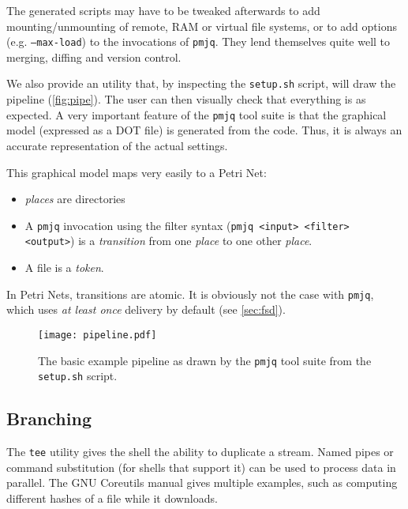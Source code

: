 \documentclass[letterpaper,twocolumn,10pt]{article}
\begin{document}
The generated scripts may have to be tweaked afterwards to add mounting/unmounting of remote, RAM or virtual file systems, or to add options (e.g. {\tt --max-load}) to the invocations of {\tt pmjq}. They lend themselves quite well to merging, diffing and version control.

We also provide an utility that, by inspecting the {\tt setup.sh} script, will draw the pipeline (\autoref{fig:pipe}). The user can then visually check that everything is as expected. A very important feature of the {\tt pmjq} tool suite is that the graphical model (expressed as a DOT file) is generated from the code. Thus, it is always an accurate representation of the actual settings.

This graphical model maps very easily to a Petri Net:
\begin{itemize}
\item \emph{places} are directories
\item A {\tt pmjq} invocation using the filter syntax ({\tt pmjq <input> <filter> <output>}) is a \emph{transition} from one \emph{place} to one other \emph{place}.
\item A file is a \emph{token}.
\end{itemize}

In Petri Nets, transitions are atomic. It is obviously not the case with {\tt pmjq}, which uses \emph{at least once} delivery by default (see \autoref{sec:fsd}).

\begin{figure}[t]
\begin{center}
\texttt{[image: pipeline.pdf]}
\end{center}
\caption{The basic example pipeline as drawn by the {\tt pmjq} tool suite from the {\tt setup.sh} script.}
\label{fig:pipe}
\end{figure}

\subsection{Branching}
\label{sec:branching}

The {\tt tee} utility gives the shell the ability to duplicate a stream. Named pipes or command substitution (for shells that support it) can be used to process data in parallel. The GNU Coreutils manual gives multiple examples, such as computing different hashes of a file while it downloads.
\end{document}
